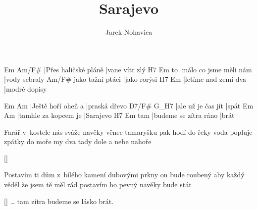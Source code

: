 \documentclass{song}
\title{Sarajevo}
\author{Jarek Nohavica}
\begin{document}
\strophe
Em                   Am/F#
|Přes haličské pláně |vane vítr zlý
   H7                     Em
to |málo co jsme měli nám |vody sebraly
                 Am/F#
jako tažní ptáci |jako rorýsi
H7                   Em
|letíme nad zemí dva |modré dopisy
\endstrophe

Em                 Am
|Ještě hoří oheň a |praská dřevo
D7/F#              G_H7
|ale už je čas jít |spát
Em                   Am
|tamhle za kopcem je |Sarajevo
    H7                    Em
tam |budeme se zítra ráno |brát
\endstrophe

\strophe*
Farář v~kostele nás sváže navěky
věnec tamaryšku pak hodí do řeky
voda popluje zpátky do moře
my dva tady dole a nebe nahoře
\endstrophe

\ref{}

\strophe*
Postavím ti dům z~bílého kamení
dubovými prkny on bude roubený
aby každý věděl že jsem tě měl rád
postavím ho pevný navěky bude stát
\endstrophe

\ref{} \ldots{} tam zítra budeme se lásko brát.
\end{document}
